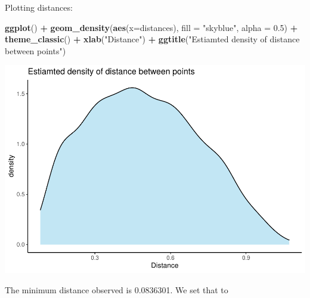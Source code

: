 \documentclass[
]{article}
\newenvironment{Shaded}{\begin{snugshade}}{\end{snugshade}}
\newcommand{\DataTypeTok}[1]{\textcolor[rgb]{0.13,0.29,0.53}{#1}}
\newcommand{\FloatTok}[1]{\textcolor[rgb]{0.00,0.00,0.81}{#1}}
\newcommand{\KeywordTok}[1]{\textcolor[rgb]{0.13,0.29,0.53}{\textbf{#1}}}
\newcommand{\NormalTok}[1]{#1}
\newcommand{\OperatorTok}[1]{\textcolor[rgb]{0.81,0.36,0.00}{\textbf{#1}}}
\newcommand{\StringTok}[1]{\textcolor[rgb]{0.31,0.60,0.02}{#1}}
\begin{document}
Plotting distances:

\begin{Shaded}
\begin{Highlighting}[]
\KeywordTok{ggplot}\NormalTok{() }\OperatorTok{+}\StringTok{ }\KeywordTok{geom_density}\NormalTok{(}\KeywordTok{aes}\NormalTok{(}\DataTypeTok{x=}\NormalTok{distances), }\DataTypeTok{fill =} \StringTok{"skyblue"}\NormalTok{, }\DataTypeTok{alpha =} \FloatTok{0.5}\NormalTok{) }\OperatorTok{+}\StringTok{ }\KeywordTok{theme_classic}\NormalTok{() }\OperatorTok{+}\StringTok{ }\KeywordTok{xlab}\NormalTok{(}\StringTok{"Distance"}\NormalTok{) }\OperatorTok{+}\StringTok{ }\KeywordTok{ggtitle}\NormalTok{(}\StringTok{"Estiamted density of distance between points"}\NormalTok{)}
\end{Highlighting}
\end{Shaded}

\includegraphics{project2_files/figure-latex/unnamed-chunk-23-1.pdf}

The minimum distance observed is 0.0836301. We set that to
\end{document}
